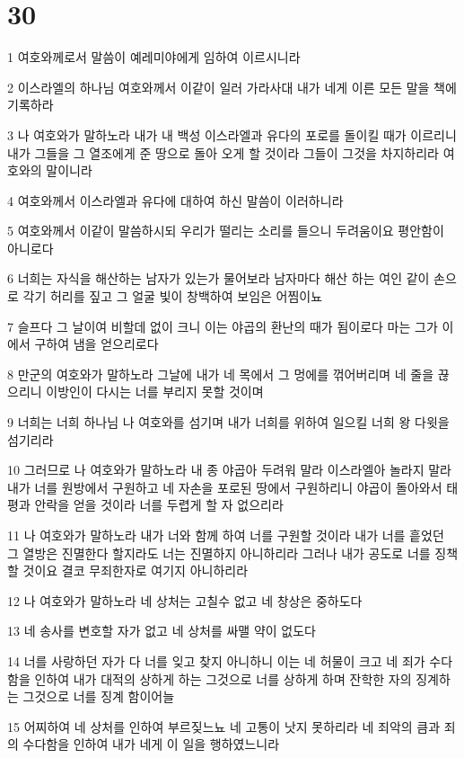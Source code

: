 \chapter{30}

\par 1 여호와께로서 말씀이 예레미야에게 임하여 이르시니라
\par 2 이스라엘의 하나님 여호와께서 이같이 일러 가라사대 내가 네게 이른 모든 말을 책에 기록하라
\par 3 나 여호와가 말하노라 내가 내 백성 이스라엘과 유다의 포로를 돌이킬 때가 이르리니 내가 그들을 그 열조에게 준 땅으로 돌아 오게 할 것이라 그들이 그것을 차지하리라 여호와의 말이니라
\par 4 여호와께서 이스라엘과 유다에 대하여 하신 말씀이 이러하니라
\par 5 여호와께서 이같이 말씀하시되 우리가 떨리는 소리를 들으니 두려움이요 평안함이 아니로다
\par 6 너희는 자식을 해산하는 남자가 있는가 물어보라 남자마다 해산 하는 여인 같이 손으로 각기 허리를 짚고 그 얼굴 빛이 창백하여 보임은 어찜이뇨
\par 7 슬프다 그 날이여 비할데 없이 크니 이는 야곱의 환난의 때가 됨이로다 마는 그가 이에서 구하여 냄을 얻으리로다
\par 8 만군의 여호와가 말하노라 그날에 내가 네 목에서 그 멍에를 꺾어버리며 네 줄을 끊으리니 이방인이 다시는 너를 부리지 못할 것이며
\par 9 너희는 너희 하나님 나 여호와를 섬기며 내가 너희를 위하여 일으킬 너희 왕 다윗을 섬기리라
\par 10 그러므로 나 여호와가 말하노라 내 종 야곱아 두려워 말라 이스라엘아 놀라지 말라 내가 너를 원방에서 구원하고 네 자손을 포로된 땅에서 구원하리니 야곱이 돌아와서 태평과 안락을 얻을 것이라 너를 두렵게 할 자 없으리라
\par 11 나 여호와가 말하노라 내가 너와 함께 하여 너를 구원할 것이라 내가 너를 흩었던 그 열방은 진멸한다 할지라도 너는 진멸하지 아니하리라 그러나 내가 공도로 너를 징책할 것이요 결코 무죄한자로 여기지 아니하리라
\par 12 나 여호와가 말하노라 네 상처는 고칠수 없고 네 창상은 중하도다
\par 13 네 송사를 변호할 자가 없고 네 상처를 싸맬 약이 없도다
\par 14 너를 사랑하던 자가 다 너를 잊고 찾지 아니하니 이는 네 허물이 크고 네 죄가 수다함을 인하여 내가 대적의 상하게 하는 그것으로 너를 상하게 하며 잔학한 자의 징계하는 그것으로 너를 징계 함이어늘
\par 15 어찌하여 네 상처를 인하여 부르짖느뇨 네 고통이 낫지 못하리라 네 죄악의 큼과 죄의 수다함을 인하여 내가 네게 이 일을 행하였느니라
